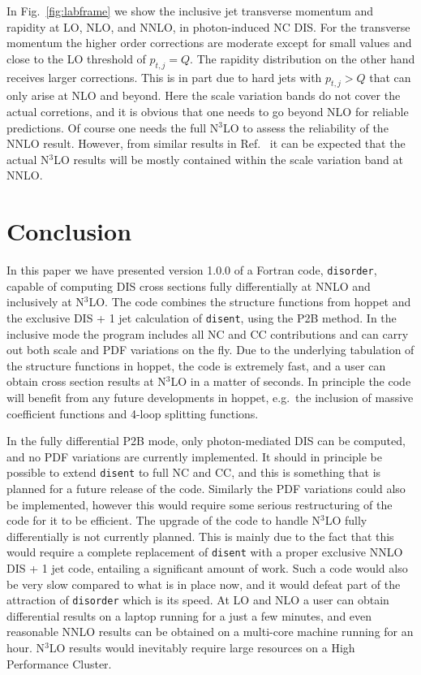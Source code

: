 \documentclass[submission, PhysCodeb]{SciPost}
\newcommand{\hoppet}{{\sc hoppet}}
\newcommand{\disent}{{\tt disent}}
\newcommand{\disorder}{{\tt disorder}}
\newcommand{\NNNLO}{N$^3$LO}
\begin{document}
In Fig.~\ref{fig:labframe} we show the inclusive jet transverse
momentum and rapidity at LO, NLO, and NNLO, in photon-induced NC
DIS. For the transverse momentum the higher order corrections are
moderate except for small values and close to the LO threshold of
$p_{t,j}=Q$. The rapidity distribution on the other hand receives
larger corrections. This is in part due to hard jets with $p_{t,j}>Q$
that can only arise at NLO and beyond. Here the scale variation bands
do not cover the actual corretions, and it is obvious that one needs
to go beyond NLO for reliable predictions. Of course one needs the
full \NNNLO{} to assess the reliability of the NNLO result. However,
from similar results in Ref.~\cite{Currie:2018fgr} it can be expected
that the actual \NNNLO{} results will be mostly contained within the
scale variation band at NNLO.

\section{Conclusion}
\label{sec:conclusion}
In this paper we have presented version 1.0.0 of a Fortran code,
\disorder{}, capable of computing DIS cross sections fully
differentially at NNLO and inclusively at \NNNLO{}. The code combines
the structure functions from \hoppet{} and the exclusive DIS + 1 jet
calculation of \disent{}, using the P2B method. In the inclusive mode
the program includes all NC and CC contributions and can carry out
both scale and PDF variations on the fly. Due to the underlying
tabulation of the structure functions in \hoppet{}, the code is
extremely fast, and a user can obtain cross section results at
\NNNLO{} in a matter of seconds. In principle the code will benefit
from any future developments in \hoppet{}, e.g.~the inclusion of
massive coefficient functions and 4-loop splitting functions.

In the fully differential P2B mode, only photon-mediated DIS can be
computed, and no PDF variations are currently implemented. It should
in principle be possible to extend \disent{} to full NC and CC, and
this is something that is planned for a future release of the
code. Similarly the PDF variations could also be implemented, however
this would require some serious restructuring of the code for it to be
efficient. The upgrade of the code to handle \NNNLO{} fully
differentially is not currently planned. This is mainly due to the
fact that this would require a complete replacement of \disent{} with
a proper exclusive NNLO DIS + 1 jet code, entailing a significant
amount of work. Such a code would also be very slow compared to what
is in place now, and it would defeat part of the attraction of
\disorder{} which is its speed. At LO and NLO a user can obtain
differential results on a laptop running for a just a few minutes, and
even reasonable NNLO results can be obtained on a multi-core machine
running for an hour. \NNNLO{} results would inevitably require
large resources on a High Performance Cluster.
\end{document}
